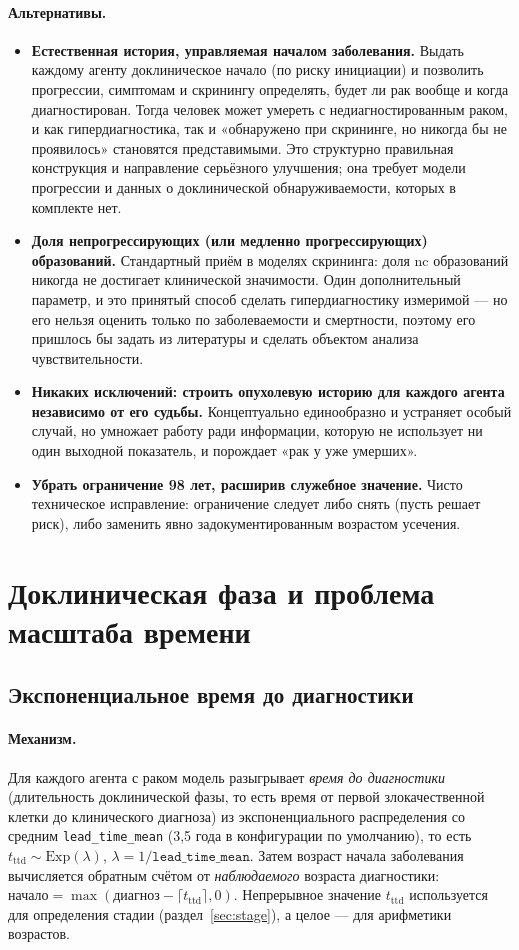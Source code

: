 \documentclass[12pt,a4paper]{article}
\newcommand{\id}[1]{\texttt{#1}}
\newcommand{\mech}[1]{\paragraph{Механизм.} #1}
\newcommand{\alt}[1]{\paragraph{Альтернативы.} #1}
\begin{document}
\alt{\begin{itemize}[nosep]
  \item \textbf{Естественная история, управляемая началом заболевания.} Выдать каждому агенту доклиническое
        начало (по риску инициации) и позволить прогрессии, симптомам и скринингу определять, будет ли рак
        вообще и когда диагностирован. Тогда человек может умереть с недиагностированным раком, и как
        гипердиагностика, так и «обнаружено при скрининге, но никогда бы не проявилось» становятся
        представимыми. Это структурно правильная конструкция и направление серьёзного улучшения; она требует
        модели прогрессии и данных о доклинической обнаруживаемости, которых в комплекте нет.
  \item \textbf{Доля непрогрессирующих (или медленно прогрессирующих) образований.} Стандартный приём в
        моделях скрининга: доля $\mathrm{nc}$ образований никогда не достигает клинической значимости. Один
        дополнительный параметр, и это принятый способ сделать гипердиагностику измеримой --- но его нельзя
        оценить только по заболеваемости и смертности, поэтому его пришлось бы задать из литературы и
        сделать объектом анализа чувствительности.
  \item \textbf{Никаких исключений: строить опухолевую историю для каждого агента независимо от его судьбы.}
        Концептуально единообразно и устраняет особый случай, но умножает работу ради информации, которую
        не использует ни один выходной показатель, и порождает «рак у уже умерших».
  \item \textbf{Убрать ограничение 98 лет, расширив служебное значение.} Чисто техническое исправление:
        ограничение следует либо снять (пусть решает риск), либо заменить явно задокументированным
        возрастом усечения.
\end{itemize}}

\section{Доклиническая фаза и проблема масштаба времени}

\subsection{Экспоненциальное время до диагностики}

\mech{Для каждого агента с раком модель разыгрывает \emph{время до диагностики} (длительность доклинической
фазы, то есть время от первой злокачественной клетки до клинического диагноза) из экспоненциального
распределения со средним \id{lead\_time\_mean} (3,5 года в конфигурации по умолчанию), то есть
$t_{\text{ttd}} \sim \mathrm{Exp}(\lambda)$, $\lambda = 1/\id{lead\_time\_mean}$. Затем возраст начала
заболевания вычисляется обратным счётом от \emph{наблюдаемого} возраста диагностики:
$\text{начало} = \max(\text{диагноз} - \lceil t_{\text{ttd}}\rceil, 0)$. Непрерывное значение
$t_{\text{ttd}}$ используется для определения стадии (раздел~\ref{sec:stage}), а целое --- для арифметики
возрастов.}
\end{document}
